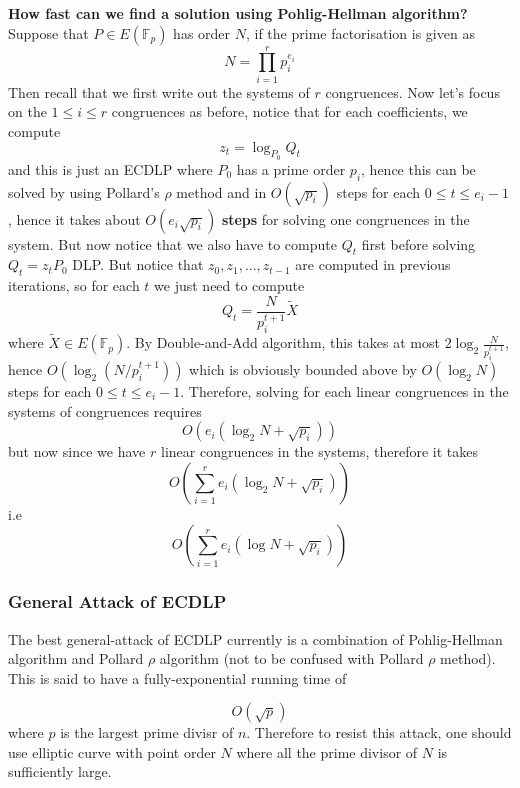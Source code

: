 \documentclass[a4 paper]{article}
\newcommand{\?}{\stackrel{?}{=}}
\begin{document}
\begin{note}{\bcicosaedre}
\textbf{How fast can we find a solution using Pohlig-Hellman algorithm?}  \\ 
Suppose that $ P \in E(\mathbb{F}_p) $ has order $ N $, if the prime factorisation is given as 
$$ N = \prod\limits_{i = 1}^{r}p_i^{e_i} $$
Then recall that we first write out the systems of $ r $ congruences. Now let's focus on the $ 1 \leq i \leq r $ congruences as before, notice that for each coefficients, we compute 
$$ z_t = \log_{P_0 }Q_t $$
and this is just an ECDLP where  $ P_0  $ has a prime order $ p_i $, hence this can be solved by using Pollard's $ \rho $ method and in $ O(\sqrt{p_i}) $ steps for each $ 0 \leq t \leq e_i - 1 $, hence it takes about $ O(e_i \sqrt{p_i}) $ \textbf{steps} for solving one congruences in the system. But now notice that we also have to compute $ Q_t $ first before solving $ Q_t = z_t P_0  $ DLP. But notice that $z_0 , z_1 ,\dots, z_{t-1}  $ are computed in previous iterations, so for each $ t $ we just need to compute 
$$ Q_t =\frac{N}{p_i^{t+1}} \tilde{X} $$
where $ \tilde{X} \in E(\mathbb{F}_p) $. By Double-and-Add algorithm, this takes at most $ 2 \log_2 \frac{N}{p_i^{t+1}} $, hence $ O(\log_2 (N / p_i^{t+1})) $ which is obviously bounded above by $ O( \log_2 N) $ steps for each $ 0 \leq t \leq e_i-1 $. Therefore, solving for each linear congruences in the systems of congruences requires 
$$ O(e_i (\log_2 N  + \sqrt{p_i})) $$ 
but now since we have $ r $ linear congruences in the systems, therefore it takes 
$$ O\left(\sum\limits_{i=1}^{r  } e_i ( \log_2 N + \sqrt{p_i})\right) $$
i.e 
$$ \boxed{O\left(\sum\limits_{i=1}^{r   } e_i (\log N  + \sqrt{p_i})\right)} $$
\cite[\S 3.1]{Sommerseth2015}\cite[\S 3.6.4; Fact 3.65]{menezes2018handbook}

\end{note}

\subsubsection{General Attack of ECDLP}
The best general-attack of ECDLP currently is a combination of Pohlig-Hellman algorithm and Pollard $ \rho $ algorithm (not to be confused with Pollard $ \rho $ method). This is said to have a fully-exponential running time of 

$$ \boxed{O(\sqrt{p})} $$
where $ p $ is the largest prime divisr of $ n $. Therefore to resist this attack, one should use elliptic curve with point order $ N $ where all the prime divisor of $ N $ is sufficiently large. \cite[\S 4.1]{hankerson2006guide}
\end{document}
